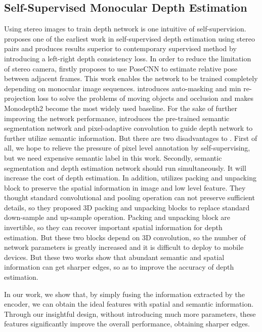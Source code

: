 \documentclass[letterpaper]{article} \usepackage{aaai21}  \usepackage{times}  \usepackage{helvet} \usepackage{courier}  \usepackage[hyphens]{url}  \usepackage{graphicx} \urlstyle{rm} \def\UrlFont{\rm}  \usepackage{natbib}  \usepackage{caption} \frenchspacing  \setlength{\pdfpagewidth}{8.5in}  \setlength{\pdfpageheight}{11in}  \usepackage{booktabs}
\begin{document}
\subsection{Self-Supervised Monocular Depth Estimation}
Using stereo images to train depth network is one intuitive of self-supervision. \cite{garg2016unsupervised} proposes one of the earliest work in self-supervised depth estimation using stereo pairs and \citep{godard2017unsupervised} produces
results superior to contemporary supervised method by introducing a left-right depth consistency loss. In order to reduce the limitation of stereo camera, \cite{zhou2017unsupervised} firstly proposes to use PoseCNN to estimate relative pose between
adjacent frames. This work enables the network to be trained completely depending on monocular image sequences. \cite{godard2019digging} introduces auto-masking and min re-projection loss to solve the problems of moving objects and occlusion and makes Monodepth2 become the most widely
used baseline. For the sake of further improving the network performance, \cite{packnet-semguided} introduces the pre-trained semantic segmentation network and pixel-adaptive convolution to guide depth network to further utilize semantic information. But there are two disadvantages 
to \cite{packnet-semguided}. First of all, we hope to relieve the pressure of pixel level annotation by self-supervising, but we need expensive semantic label in this work. Secondly, semantic segmentation and depth
estimation network should run simultaneously. It will increase the cost of depth estimation. In addition, \cite{packnet} utilizes packing and unpacking block to preserve the spatial information in image and low level feature.
They thought standard convolutional and pooling operation can not preserve sufficient details, so they proposed 3D packing and unpacking blocks to replace standard down-sample and up-sample operation. 
Packing and unpacking block are invertible, so they can recover important spatial information for depth estimation. But these two blocks depend on 3D convolution, so the number of network parameters is greatly increased and it is difficult to deploy to
mobile devices. But these two works show that abundant semantic and spatial information can get sharper edges, so as to improve the accuracy of depth estimation.

In our work, we show that, by simply fusing the information extracted by the encoder, we can obtain the ideal features with spatial and semantic information. Through our insightful design, without introducing much more parameters, these features significantly improve the overall performance, obtaining sharper edges.
\end{document}
